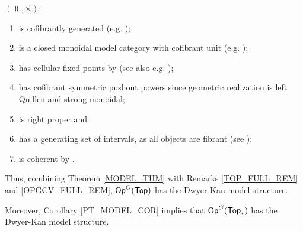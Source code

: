 \documentclass[a4paper,10pt
,draft
]{article}%
\renewcommand{\1}{\eta}%
\begin{document}




\begin{example}
      $(\Top,\times)$:
      \begin{enumerate}[label = (\roman*)]
      \item is cofibrantly generated (e.g. \cite{Pia91});
      \item is a closed monoidal model category with cofibrant unit (e.g. \cite[Prop. 4.2.11]{Hov99});
      \item has cellular fixed points by \cite{Pia91} (see also e.g. \cite[Lemma 3.18]{Ste16});
      \item has cofibrant symmetric pushout powers since geometric realization is left Quillen and strong monoidal;
      \item is right proper and
      \item has a generating set of intervals, as all objects are fibrant (see \cite[Lemma 2.1]{BM13});
      \item is coherent by \cite[Lem. 4.16]{BV73}.
      \end{enumerate}
      Thus, combining Theorem \ref{MODEL_THM} with Remarks \ref{TOP_FULL_REM} and \ref{OPGCV_FULL_REM},
      $\mathsf{Op}^G(\mathsf{Top})$ has the Dwyer-Kan model structure.

      Moreover, Corollary \ref{PT_MODEL_COR} implies that $\Op^G(\Top_{\**})$ has the Dwyer-Kan model structure.

\end{example}



\end{document}
